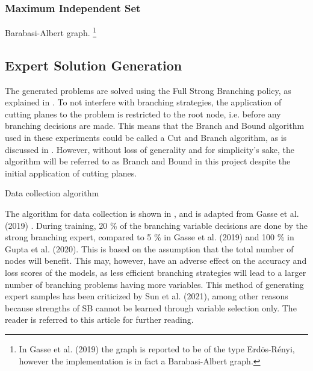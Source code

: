 \subsubsection{Maximum Independent Set}


Barabasi-Albert graph.
\footnote{In Gasse et al. (2019) the graph is reported to be of the type Erd\"{o}s-R\'{e}nyi, however the implementation is in fact a Barabasi-Albert graph.}




\subsection{Expert Solution Generation}\label{ssec:expertsolutiongeneration}

The generated problems are solved using the Full Strong Branching policy, as explained in . To not interfere with branching strategies, the application of cutting planes to the problem is restricted to the root node, i.e. before any branching decisions are made. This means that the Branch and Bound algorithm used in these experiments could be called a Cut and Branch algorithm, as is discussed in .
However, without loss of generality and for simplicity's sake, the algorithm will be referred to as Branch and Bound in this project despite the initial application of cutting planes.  


\begin{algorithm}[H]
    \SetAlgoLined
    
    \caption{\label{alg:datacol} Data collection algorithm}
\end{algorithm}


The algorithm for data collection is shown in , and is adapted from Gasse et al. (2019) \cite{gasse2019exact}. During training, 20 \% of the branching variable decisions are done by the strong branching expert, compared to 5 \% in Gasse et al. (2019) \cite{gasse2019exact} and 100 \% in Gupta et al. (2020). This is based on the assumption that the total number of nodes will benefit. This may, however, have an adverse effect on the accuracy and loss scores of the models, as less efficient branching strategies will lead to a larger number of branching problems having more variables. This method of generating expert samples has been criticized by Sun et al. (2021)\cite{sun2021improving}, among other reasons because strengths of \gls{SB} cannot be learned through variable selection only. The reader is referred to this article for further reading.



